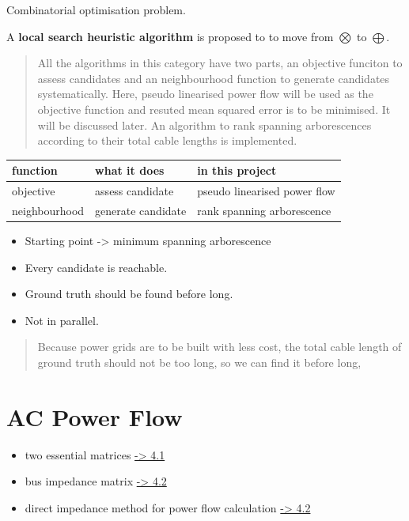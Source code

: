 \documentclass[
]{book}
\providecommand{\tightlist}{%
  \setlength{\itemsep}{0pt}\setlength{\parskip}{0pt}}
\begin{document}
Combinatorial optimisation problem.

A \textbf{local search heuristic algorithm} is proposed to to move from \(\bigotimes\)
to \(\bigoplus\). \citep{michiels2007theoretical}

\begin{quote}
All the algorithms in this category have two parts, an objective funciton to
assess candidates and an neighbourhood function to generate candidates
systematically. Here, pseudo linearised power flow will be used as the
objective function and resuted mean squared error is to be minimised. It will
be discussed later. An algorithm to rank spanning arborescences according to
their total cable lengths is implemented.
\end{quote}

\begin{table}[H]
\centering
\begin{tabular}[t]{l|l|l}
\hline
function & what it does & in this project\\
\hline
objective & assess candidate & pseudo linearised power flow\\
\hline
neighbourhood & generate candidate & rank spanning arborescence\\
\hline
\end{tabular}
\end{table}

\begin{itemize}
\tightlist
\item
  Starting point -\textgreater{} minimum spanning arborescence
\item
  Every candidate is reachable.
\item
  Ground truth should be found before long.
\item
  Not in parallel.
\end{itemize}

\begin{quote}
Because power grids are to be built with less cost, the total cable length
of ground truth should not be too long, so we can find it before long,
\end{quote}

\hypertarget{ac-power-flow}{%
\chapter{AC Power Flow}\label{ac-power-flow}}

\begin{itemize}
\tightlist
\item
  two essential matrices \protect\hyperlink{matrices}{-\textgreater{} 4.1}
\item
  bus impedance matrix \protect\hyperlink{BIM}{-\textgreater{} 4.2}
\item
  direct impedance method for power flow calculation \protect\hyperlink{power-flow}{-\textgreater{} 4.2}
\end{itemize}
\end{document}
